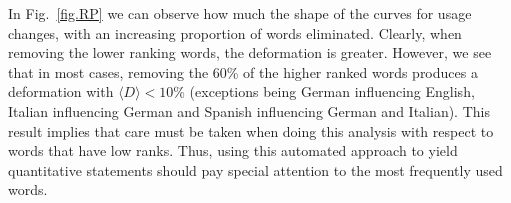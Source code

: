 \documentclass[10pt,letterpaper]{article} %
\begin{document}
% 

In Fig.~\ref{fig.RP} we can observe how much the shape of the curves for usage changes, 
with an increasing proportion of words eliminated. Clearly, when removing the 
lower ranking words, the deformation is greater. However, we see that in 
most cases,  removing the 60\% of the higher ranked words produces
a deformation with $\langle D \rangle < 10\%$ (exceptions being 
German influencing English, Italian influencing German and
Spanish influencing German and Italian). 
% 
% 
% 
% 
This result implies that care must be taken when doing this analysis with respect to 
words that have low ranks. Thus, using this automated approach
to yield quantitative statements should pay special attention to the most frequently used words. 

% 
\end{document}
